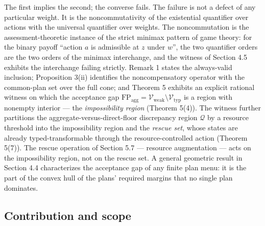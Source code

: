 \documentclass[3p,11pt]{elsarticle}
\begin{document}
The first implies the second; the converse fails. The failure is not a
defect of any particular weight. It is the noncommutativity of the
existential quantifier over actions with the universal quantifier over
weights. The noncommutation is the assessment-theoretic instance of the
strict minimax pattern of game theory: for the binary payoff ``action
\(a\) is admissible at \(z\) under \(w\)'', the two quantifier orders
are the two orders of the minimax interchange, and the witness of
Section 4.5 exhibits the interchange failing strictly. Remark 1 states the always-valid inclusion; Proposition 3(ii) identifies the noncompensatory operator with the common-plan set over the full cone; and Theorem 5 exhibits an explicit rational witness on which the acceptance gap
\(\mathrm{FP}_{\mathrm{agg}} = \mathcal{V}_{\mathrm{weak}} \setminus \mathcal{V}_{\mathrm{typ}}\)
is a region with nonempty interior --- the \emph{impossibility region}
(Theorem 5(4)). The witness further partitions the
aggregate-versus-direct-floor discrepancy region \(\mathcal{Q}\) by a
resource threshold into the impossibility region and the \emph{rescue
set}, whose states are already typed-transformable through the
resource-controlled action (Theorem 5(7)). The rescue operation of
Section 5.7 --- resource augmentation --- acts on the impossibility
region, not on the rescue set. A general geometric result in Section 4.4
characterizes the acceptance gap of any finite plan menu: it is the part
of the convex hull of the plans' required margins that no single plan
dominates.

\subsection{Contribution and scope}\label{contribution-and-scope}
\end{document}
